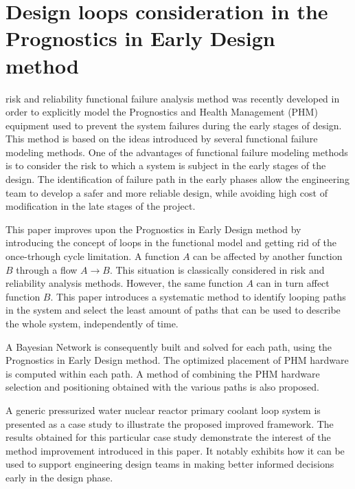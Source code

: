 %
%
\let\textcircled=\pgftextcircled
\chapter{Design loops consideration in the Prognostics in Early Design method}
\label{chap:new}

 risk and reliability functional failure analysis method was recently developed in order to explicitly model the Prognostics and Health Management (PHM) equipment used to prevent the system failures during the early stages of design. This method is based on the ideas introduced by several functional failure modeling methods. One of the advantages of functional failure modeling methods is to consider the risk to which a system is subject in the early stages of the design. The identification of failure path in the early phases allow the engineering team to develop a safer and more reliable design, while avoiding high cost of modification in the late stages of the project.

This paper improves upon the Prognostics in Early Design method by introducing the concept of loops in the functional model and getting rid of the once-trhough cycle limitation. A function $A$ can be affected by another function $B$ through a flow $A\rightarrow B$. This situation is classically considered in risk and reliability analysis methods. However, the same function $A$ can in turn affect function $B$. This paper introduces a systematic method to identify looping paths in the system and select the least amount of paths that can be used to describe the whole system, independently of time.

A Bayesian Network is consequently built and solved for each path, using the Prognostics in Early Design method. The optimized placement of PHM hardware is computed within each path. A method of combining the PHM hardware selection and positioning obtained with the various paths is also proposed.

A generic pressurized water nuclear reactor primary coolant loop system is presented as a case study to illustrate the proposed improved framework. The results obtained for this particular case study demonstrate the interest of the method improvement introduced in this paper. It notably exhibits how it can be used to support engineering design teams in making better informed decisions early in the design phase.


